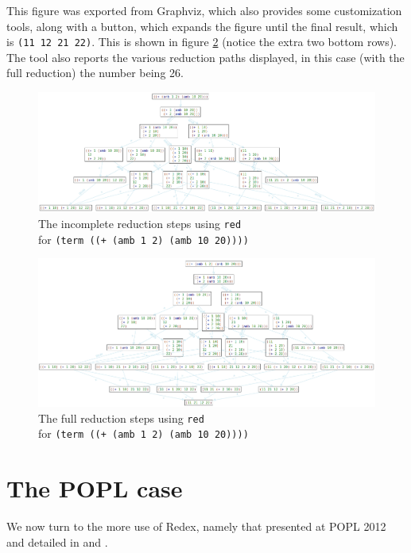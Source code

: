 This figure was exported from Graphviz, which also provides some customization
tools, along with a  button, which expands the figure until
the final result, which is \texttt{(11 12 21 22)}. This is shown in
figure \ref{fig:traces-amb-full} (notice the extra two bottom rows).
The tool also reports the various reduction paths displayed, in this case
(with the full reduction) the number being 26.

\newpage
\begin{landscape}
  \centering
  \begin{figure}[!h]
    \includegraphics[scale=0.4]{fig/traces-amb.png}
    \caption{The incomplete reduction steps using \texttt{red} \\
      for \texttt{(term ((+ (amb 1 2) (amb 10 20))))}}
    \label{fig:traces-amb}
  \end{figure}
\end{landscape}

\newpage
\begin{landscape}
  \centering
  \begin{figure}[!h]
    \includegraphics[scale=0.4]{fig/traces-amb-full.png}
    \caption{The full reduction steps using \texttt{red} \\
      for \texttt{(term ((+ (amb 1 2) (amb 10 20))))}}
    \label{fig:traces-amb-full}
  \end{figure}
\end{landscape}


\section{The POPL case}

We now turn to the more  use of Redex, namely that presented at
POPL 2012 and detailed in \cite{popl} and \cite{sewpr}.




